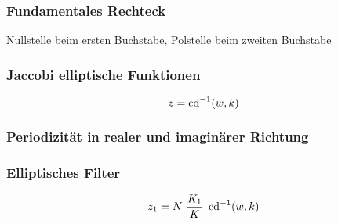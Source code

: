 \documentclass[ngerman, aspectratio=169, xcolor={rgb}]{beamer}
\begin{document}
	\begin{frame}
		\frametitle{Fundamentales Rechteck}

		Nullstelle beim ersten Buchstabe, Polstelle beim zweiten Buchstabe

		\begin{center}
			\scalebox{0.8}{
				
			}
		\end{center}

	\end{frame}


	\begin{frame}
		\frametitle{Jaccobi elliptische Funktionen}

		\begin{equation*}
			z = \cd^{-1}(w, k)
		\end{equation*}

		\begin{center}
			\scalebox{0.7}{
				

			}
		\end{center}

	\end{frame}

	\begin{frame}
		\frametitle{Periodizität in realer und imaginärer Richtung}

		\begin{center}
			
		\end{center}


	\end{frame}

	\begin{frame}
		\frametitle{Elliptisches Filter}

		\begin{equation*}
			z_1 = N~\frac{K_1}{K}~\cd^{-1}(w, k)
		\end{equation*}

		\begin{center}
			\scalebox{0.8}{
				
			}
		\end{center}

	\end{frame}
\end{document}

